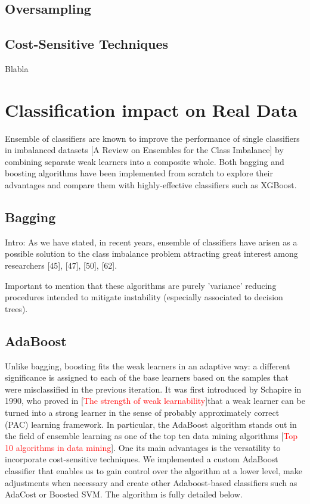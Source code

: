 \documentclass[conference]{IEEEtran}
\begin{document}
	\subsection{Oversampling}

	\subsection{Cost-Sensitive Techniques}
	Blabla

\section{Classification impact on Real Data}
Ensemble of classifiers are known to improve the performance of single classifiers in imbalanced datasets [A Review on Ensembles for the Class Imbalance] by combining separate weak learners into a composite whole. Both bagging and boosting algorithms have been implemented from scratch to explore their advantages and compare them with highly-effective classifiers such as XGBoost. 

\subsection{Bagging}

Intro:
As we have stated, in recent years, ensemble of classifiers have arisen as a possible solution to the class imbalance problem attracting great interest among researchers [45], [47], [50], [62].

Important to mention that these algorithms are purely 'variance' reducing procedures intended to mitigate instability (especially associated to decision trees). 

\subsection{AdaBoost}
Unlike bagging, boosting fits the weak learners in an adaptive way: a different significance is assigned to each of the base learners based on the samples that were misclassified in the previous iteration. It was first introduced by Schapire in 1990, who proved in [\textcolor{red}{The strength of weak learnability}]that a weak learner can be turned into a strong learner in the sense of probably approximately correct (PAC) learning framework. In particular, the AdaBoost algorithm stands out in the field of ensemble learning as one of the top ten data mining algorithms [\textcolor{red}{Top 10 algorithms in data mining}]. One its main advantages is the versatility to incorporate cost-sensitive techniques. We implemented a custom AdaBoost classifier that enables us to gain control over the algorithm at a lower level, make adjustments when necessary and create other Adaboost-based classifiers such as AdaCost or Boosted SVM. The algorithm is fully detailed below.
\end{document}
